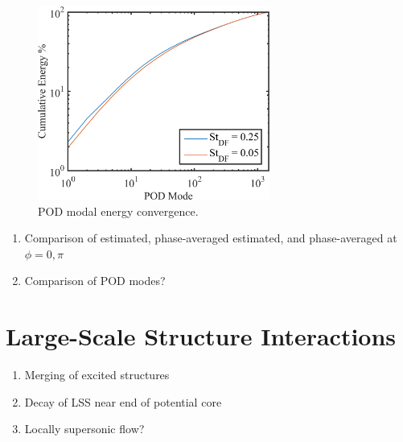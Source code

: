 \begin{figure}
	\centering
	\includegraphics[width=3in]{Figures/ch4_POD_energies.png}
	\caption{POD modal energy convergence.}
	\label{fig:ch4_modal_energy}
\end{figure}
\begin{enumerate}
	\item Comparison of estimated, phase-averaged estimated, and phase-averaged at $\phi = 0, \pi$
	\item Comparison of POD modes?
\end{enumerate}

\section{Large-Scale Structure Interactions}
\begin{enumerate}
	\item Merging of excited structures
	\item Decay of LSS near end of potential core
	\item Locally supersonic flow?
\end{enumerate}

